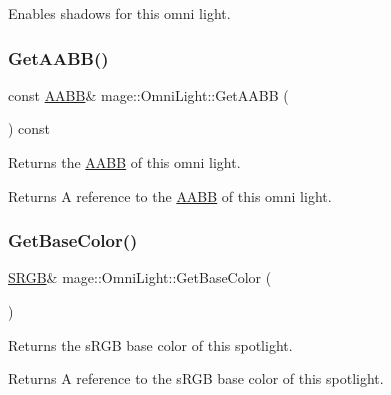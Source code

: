 Enables shadows for this omni light. \hypertarget{classmage_1_1_omni_light_a13fd21cba1f757156ceb6e2ba298ce07}{}\label{classmage_1_1_omni_light_a13fd21cba1f757156ceb6e2ba298ce07} 
\subsubsection{\texorpdfstring{Get\+A\+A\+B\+B()}{GetAABB()}}
{\footnotesize\ttfamily const \hyperlink{classmage_1_1_a_a_b_b}{A\+A\+BB}\& mage\+::\+Omni\+Light\+::\+Get\+A\+A\+BB (\begin{DoxyParamCaption}{ }\end{DoxyParamCaption}) const\hspace{0.3cm}{\ttfamily [noexcept]}}

Returns the \hyperlink{classmage_1_1_a_a_b_b}{A\+A\+BB} of this omni light.

\begin{DoxyReturn}{Returns}
A reference to the \hyperlink{classmage_1_1_a_a_b_b}{A\+A\+BB} of this omni light. 
\end{DoxyReturn}
\hypertarget{classmage_1_1_omni_light_ab39019947e9964f529bf524950d4801e}{}\label{classmage_1_1_omni_light_ab39019947e9964f529bf524950d4801e} 
\subsubsection{\texorpdfstring{Get\+Base\+Color()}{GetBaseColor()}\hspace{0.1cm}{\footnotesize\ttfamily [1/2]}}
{\footnotesize\ttfamily \hyperlink{structmage_1_1_s_r_g_b}{S\+R\+GB}\& mage\+::\+Omni\+Light\+::\+Get\+Base\+Color (\begin{DoxyParamCaption}{ }\end{DoxyParamCaption})\hspace{0.3cm}{\ttfamily [noexcept]}}

Returns the s\+R\+GB base color of this spotlight.

\begin{DoxyReturn}{Returns}
A reference to the s\+R\+GB base color of this spotlight. 
\end{DoxyReturn}
\hypertarget{classmage_1_1_omni_light_aa61c2aa9fcc7f8d9d1140cb4a1ecd1fb}{}\label{classmage_1_1_omni_light_aa61c2aa9fcc7f8d9d1140cb4a1ecd1fb} 
